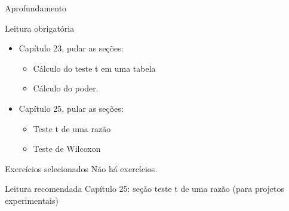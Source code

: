 \documentclass{beamer}
\begin{document}
\begin{frame}{Aprofundamento}
  \begin{block}{Leitura obrigatória}
    \begin{itemize}
      \small
    \item Capítulo 23, pular as seções:
      \begin{itemize}
        \scriptsize
      \item Cálculo do teste t em uma tabela
      \item Cálculo do poder.
      \end{itemize}
    \item Capítulo 25, pular as seções:
      \begin{itemize}
        \scriptsize
      \item Teste t de uma razão
      \item Teste de Wilcoxon
      \end{itemize}
    \end{itemize}
  \end{block}
  \begin{block}{Exercícios selecionados}
    \footnotesize
    Não há exercícios.
  \end{block}
  \begin{block}{Leitura recomendada}
    \footnotesize
    Capítulo 25: seção teste t de uma razão (para projetos experimentais)
  \end{block}
\end{frame}
\end{document}
